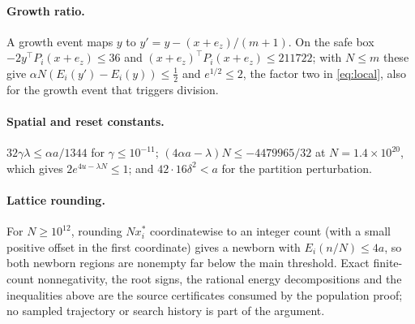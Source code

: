 \documentclass[11pt,a4paper]{article}
\theoremstyle{plain}
\theoremstyle{definition}
\theoremstyle{remark}
\begin{document}
\paragraph{Growth ratio.}
A growth event maps $y$ to $y'=y-(x+e_z)/(m+1)$. On the safe box $-2y^{\!\top}P_i(x+e_z)\leq36$ and $(x+e_z)^{\!\top}P_i(x+e_z)\leq211722$; with $N\leq m$ these give $\alpha N(E_i(y')-E_i(y))\leq\frac12$ and $e^{1/2}\leq2$, the factor two in \eqref{eq:local}, also for the growth event that triggers division.

\paragraph{Spatial and reset constants.}
$32\gamma\lambda\leq\alpha a/1344$ for $\gamma\leq10^{-11}$; $(4\alpha a-\lambda)N\leq-4479965/32$ at $N=1.4\times10^{20}$, which gives $2e^{4u-\lambda N}\leq1$; and $42\cdot16\delta^2<a$ for the partition perturbation.

\paragraph{Lattice rounding.}
For $N\geq10^{12}$, rounding $Nx_i^*$ coordinatewise to an integer count (with a small positive offset in the first coordinate) gives a newborn with $E_i(n/N)\leq4a$, so both newborn regions are nonempty far below the main threshold. Exact finite-count nonnegativity, the root signs, the rational energy decompositions and the inequalities above are the source certificates consumed by the population proof; no sampled trajectory or search history is part of the argument.
\end{document}
